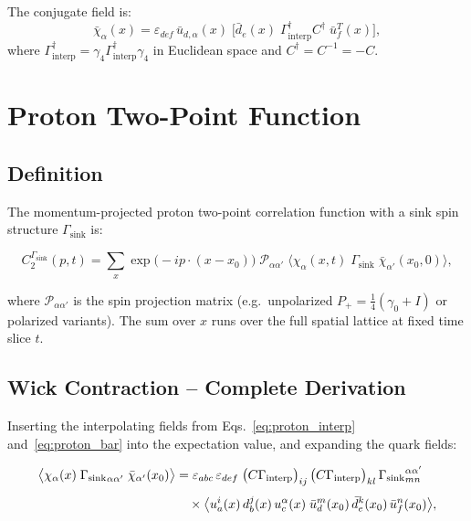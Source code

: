 \documentclass[11pt,a4paper]{article}
\newcommand{\eps}{\varepsilon}
\newcommand{\Gammaint}{\Gamma_{\text{interp}}}
\newcommand{\Gammasink}{\Gamma_{\text{sink}}}
\newcommand{\Cmat}{C}
\newcommand{\xvec}{x}
\newcommand{\xzerovec}{x_0}
\begin{document}
The conjugate field is:
\begin{equation}
  \bar{\chi}_\alpha(x) =
    \eps_{def}\,
    \bar{u}_{d,\alpha}(x) \;
    \bigl[ \bar{d}_e(x) \; \Gammaint^\dagger \Cmat^\dagger \;
           \bar{u}_f^T(x) \bigr],
  \label{eq:proton_bar}
\end{equation}
where $\Gammaint^\dagger = \gamma_4 \Gammaint^\dagger \gamma_4$ in Euclidean space
and $\Cmat^\dagger = \Cmat^{-1} = -\Cmat$.

\section{Proton Two-Point Function}
\label{sec:two_point}

\subsection{Definition}

The momentum-projected proton two-point correlation function with a sink spin
structure $\Gammasink$ is:

\begin{equation}
  C_2^{\Gammasink}(p, t) =
    \sum_{\xvec} \exp\bigl(-i p\cdot (\xvec - \xzerovec)\bigr) \;
    \mathcal{P}_{\alpha\alpha'} \;
    \bigl\langle
      \chi_\alpha(\xvec, t) \; \Gammasink \;
      \bar{\chi}_{\alpha'}(\xzerovec, 0)
    \bigr\rangle,
  \label{eq:C2_def}
\end{equation}

where $\mathcal{P}_{\alpha\alpha'}$ is the spin projection matrix (e.g.\ unpolarized
$P_+ = \frac{1}{4}(\gamma_0 + I)$ or polarized variants). The sum over $\xvec$ runs
over the full spatial lattice at fixed time slice $t$.

\subsection{Wick Contraction -- Complete Derivation}

Inserting the interpolating fields from Eqs.~\eqref{eq:proton_interp}
and~\eqref{eq:proton_bar} into the expectation value, and expanding the quark fields:

\begin{align}
  \bigl\langle \chi_\alpha(x) \; {\Gammasink}_{\alpha\alpha'} \;
    \bar{\chi}_{\alpha'}(x_0) \bigr\rangle
  &=
  \eps_{abc}\, \eps_{def} \;
  \bigl(\Cmat \Gammaint\bigr)_{ij}\,
  \bigl(\Cmat \Gammaint\bigr)_{kl}\,
  {\Gammasink}^{\alpha\alpha'}_{mn} \notag \\[4pt]
  &\quad\times
  \bigl\langle
    u_a^i(x)\, d_b^j(x)\, u_c^\alpha(x) \;
    \bar{u}_d^m(x_0)\, \bar{d}_e^k(x_0)\, \bar{u}_f^n(x_0)
  \bigr\rangle,
  \label{eq:raw_contraction}
\end{align}
\end{document}
